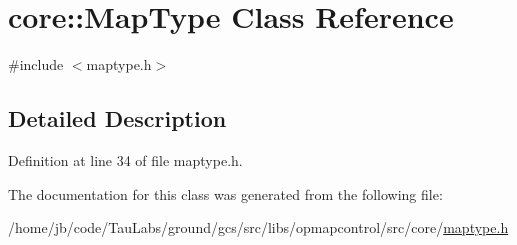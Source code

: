 \hypertarget{classcore_1_1_map_type}{\section{core\-:\-:\-Map\-Type \-Class \-Reference}
\label{classcore_1_1_map_type}
}


{\ttfamily \#include $<$maptype.\-h$>$}



\subsection{\-Detailed \-Description}


\-Definition at line 34 of file maptype.\-h.



\-The documentation for this class was generated from the following file\-:\begin{DoxyCompactItemize}
\item 
/home/jb/code/\-Tau\-Labs/ground/gcs/src/libs/opmapcontrol/src/core/\hyperlink{maptype_8h}{maptype.\-h}\end{DoxyCompactItemize}
